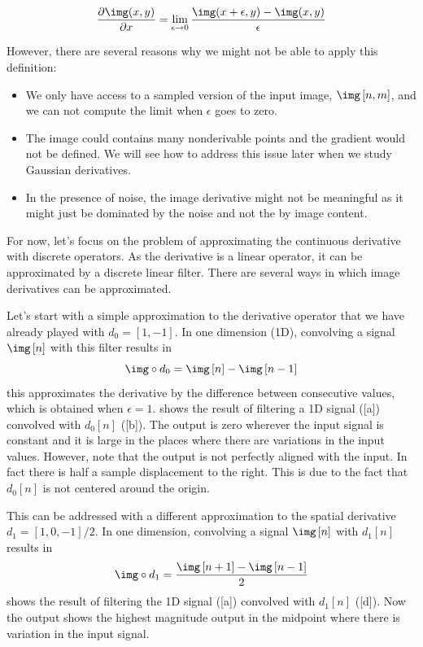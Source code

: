 \begin{equation}
	\frac{\partial \img(x,y)} {\partial x} = \lim_{\epsilon \to 0} \frac{ \img(x+\epsilon,y) -\img(x,y)} {\epsilon}
\end{equation}

However, there are several reasons why we might not be able to apply this definition:
\begin{itemize}
	\item We only have access to a sampled version of the input image, $\img \left[n,m\right]$, and we can not compute the limit when $\epsilon$ goes to zero.
	\item The image could contains many nonderivable points and the gradient would not be defined. We will see how to address this issue later when we study Gaussian derivatives.
	\item In the presence of noise, the image derivative might not be meaningful as it might just be dominated by the noise and not the by image content.
\end{itemize}

For now, let's focus on the problem of approximating the continuous derivative with discrete operators. As the derivative is a linear operator, it can be approximated by a discrete linear filter. There are several ways in which image derivatives can be approximated.

Let's start with a simple approximation to the derivative operator that we have already played with $d_0  = \left[1, -1 \right]$.
In one dimension (1D), convolving a signal $\img \left[n \right]$ with this filter results in
\begin{equation}
	\img \circ d_0 = \img \left[n \right] - \img \left[n-1 \right]
\end{equation}
this approximates the derivative by the difference between consecutive values, which is obtained when $\epsilon=1$.  shows the result of filtering a 1D signal (\fig{\ref{fig:discretederivative}}[a]) convolved with $d_0 \left[n\right]$ (\fig{\ref{fig:discretederivative}}[b]). The output is zero wherever the input signal is constant and it is large in the places where there are variations in the input values. However, note that the output is not perfectly aligned with the input. In fact there is half a sample displacement to the right. This is due to the fact that $d_0 \left[n\right]$ is not centered around the origin.

This can be addressed with a different approximation to the spatial derivative $d_1  = \left[1, 0, -1 \right]/2$. In one dimension, convolving a signal $\img \left[n \right]$ with $d_1 \left[n\right]$ results in
\begin{equation}
	\img \circ d_1 = \frac{\img \left[n+1 \right] - \img \left[n-1 \right]}{2}
\end{equation}
 shows the result of filtering the 1D signal (\fig{\ref{fig:discretederivative}}[a]) convolved with $d_1 \left[n\right]$ (\fig{\ref{fig:discretederivative}}[d]). Now the output shows the highest magnitude output in the midpoint where there is variation in the input signal.

